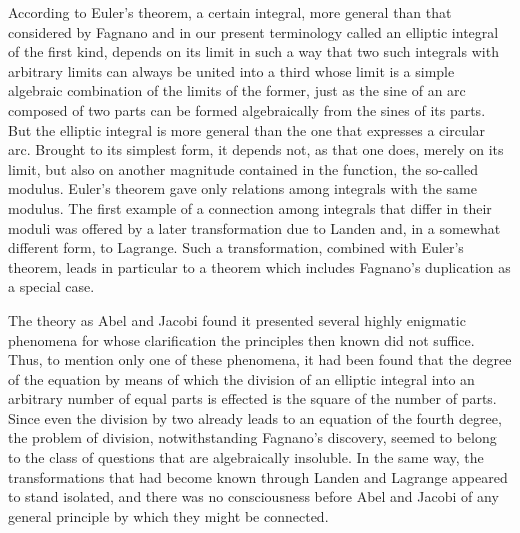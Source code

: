 \documentclass[11pt]{article}
\begin{document}
According to Euler's theorem, a certain integral, more general than that considered by Fagnano and in our present terminology called an elliptic integral of the first kind, depends on its limit in such a way that two such integrals with arbitrary limits can always be united into a third whose limit is a simple algebraic combination of the limits of the former, just as the sine of an arc composed of two parts can be formed algebraically from the sines of its parts. But the elliptic integral is more general than the one that expresses a circular arc. Brought to its simplest form, it depends not, as that one does, merely on its limit, but also on another magnitude contained in the function, the so-called modulus. Euler's theorem gave only relations among integrals with the same modulus. The first example of a connection among integrals that differ in their moduli was offered by a later transformation due to Landen and, in a somewhat different form, to Lagrange. Such a transformation, combined with Euler's theorem, leads in particular to a theorem which includes Fagnano's duplication as a special case.

The theory as Abel and Jacobi found it presented several highly enigmatic phenomena for whose clarification the principles then known did not suffice. Thus, to mention only one of these phenomena, it had been found that the degree of the equation by means of which the division of an elliptic integral into an arbitrary number of equal parts is effected is the square of the number of parts. Since even the division by two already leads to an equation of the fourth degree, the problem of division, notwithstanding Fagnano's discovery, seemed to belong to the class of questions that are algebraically insoluble. In the same way, the transformations that had become known through Landen and Lagrange appeared to stand isolated, and there was no consciousness before Abel and Jacobi of any general principle by which they might be connected.
\end{document}
